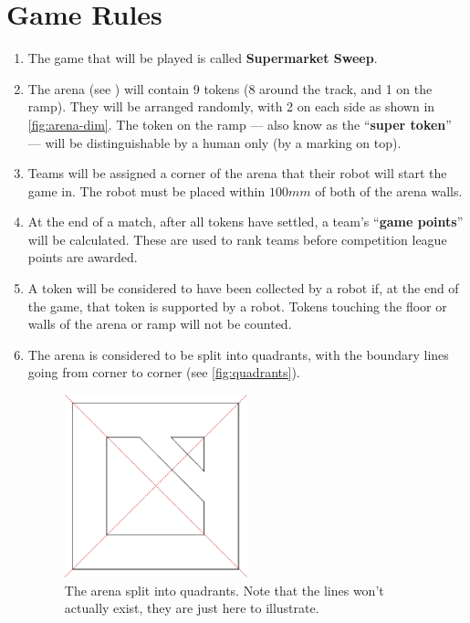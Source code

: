 \section {Game Rules}
\label{game-rules}

\begin{enumerate}
\item The game that will be played is called \textbf{Supermarket Sweep}.
\item The arena (see ) will contain 9 tokens (8 around the track, and 1 on the ramp).
 They will be arranged randomly, with 2 on each side as shown in \autoref{fig:arena-dim}.
 The token on the ramp --- also know as the ``\textbf{super token}'' --- will be distinguishable by a human only (by a marking on top).
\item Teams will be assigned a corner of the arena that their robot will start the game in.
 The robot must be placed within $100mm$ of both of the arena walls.
\item At the end of a match, after all tokens have settled, a team's ``\textbf{game points}'' will be calculated.
 These are used to rank teams before competition league points are awarded.
\item A token will be considered to have been collected by a robot if, at the end of the game, that token is supported by a robot.
 Tokens touching the floor or walls of the arena or ramp will not be counted.

\item The arena is considered to be split into quadrants, with the boundary lines going from corner to corner (see \autoref{fig:quadrants}).

\begin{figure}
\begin{center}
  \includegraphics[keepaspectratio, clip, width=0.5\textwidth]{./images/quadrants.pdf}
  \caption{\label{fig:quadrants}The arena split into quadrants.
           Note that the lines won't actually exist, they are just here to illustrate.}
\end{center}
\end{figure}


\end{enumerate}
